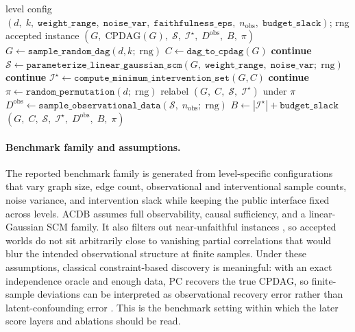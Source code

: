 \begin{algorithm}[t]
\small
\caption{Accepted benchmark instance assembly. One iteration of the rejection loop draws a DAG, parameterizes a linear-Gaussian SCM, computes the resolving-intervention set, then permutes labels and samples the observational data. Three reject gates discard graphs with trivial CPDAGs, near-unfaithful SCMs, and CPDAGs that are already fully oriented. Predicate definitions are in Appendix~\ref{app:instance:filters}.}
\label{alg:instance-assembly}
\begin{algorithmic}[1]
\Require level config $(d,\; k,\; \texttt{weight\_range},\; \texttt{noise\_var},\; \texttt{faithfulness\_eps},\; n_{\mathrm{obs}},\; \texttt{budget\_slack})$; rng
\Ensure  accepted instance $(G,\; \mathrm{CPDAG}(G),\; \mathcal{S},\; \mathcal{I}^\star,\; D^{\mathrm{obs}},\; B,\; \pi)$
\Repeat
  \State $G \gets \texttt{sample\_random\_dag}(d, k;\; \mathrm{rng})$
  \State $C \gets \texttt{dag\_to\_cpdag}(G)$
   \textbf{continue} \EndIf
  \State $\mathcal{S} \gets \texttt{parameterize\_linear\_gaussian\_scm}(G,\; \texttt{weight\_range},\; \texttt{noise\_var};\; \mathrm{rng})$
   \textbf{continue} \EndIf
  \State $\mathcal{I}^\star \gets \texttt{compute\_minimum\_intervention\_set}(G, C)$
   \textbf{continue} \EndIf
  \State $\pi \gets \texttt{random\_permutation}(d;\; \mathrm{rng})$
  \State relabel $(G,\; C,\; \mathcal{S},\; \mathcal{I}^\star)$ under $\pi$
  \State $D^{\mathrm{obs}} \gets \texttt{sample\_observational\_data}(\mathcal{S},\; n_{\mathrm{obs}};\; \mathrm{rng})$
  \State $B \gets |\mathcal{I}^\star| + \texttt{budget\_slack}$
  \State \Return $(G,\; C,\; \mathcal{S},\; \mathcal{I}^\star,\; D^{\mathrm{obs}},\; B,\; \pi)$
\end{algorithmic}
\vspace{-0.4em}
\end{algorithm}

\paragraph{Benchmark family and assumptions.} The reported benchmark family is generated from level-specific configurations that vary graph size, edge count, observational and interventional sample counts, noise variance, and intervention slack while keeping the public interface fixed across levels. ACDB assumes full observability, causal sufficiency, and a linear-Gaussian SCM family. It also filters out near-unfaithful instances \citep{spirtes2000causation}, so accepted worlds do not sit arbitrarily close to vanishing partial correlations that would blur the intended observational structure at finite samples. Under these assumptions, classical constraint-based discovery is meaningful: with an exact independence oracle and enough data, PC recovers the true CPDAG, so finite-sample deviations can be interpreted as observational recovery error rather than latent-confounding error \citep{spirtes2000causation}. This is the benchmark setting within which the later score layers and ablations should be read.
